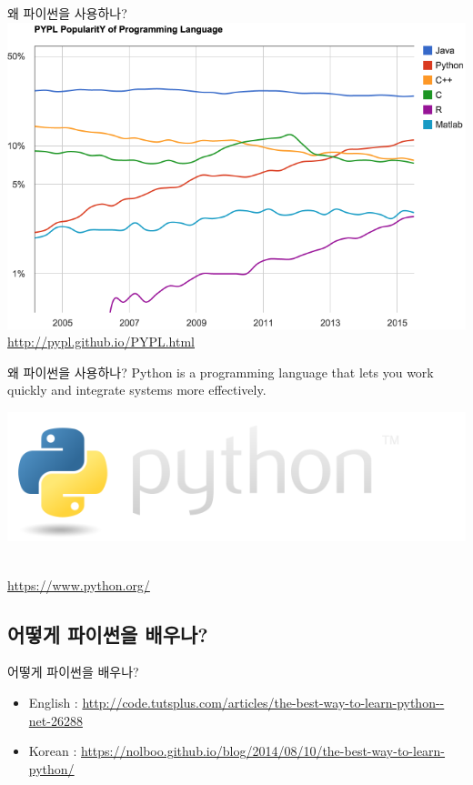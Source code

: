 \documentclass[10pt]{beamer}
\begin{document}
\begin{frame}{왜 파이썬을 사용하나?}{}
	\centering
	\includegraphics[scale=0.38]{contents/pypl.png}\\
	\tiny{\url{http://pypl.github.io/PYPL.html}}
\end{frame}

\begin{frame}{왜 파이썬을 사용하나?}{}
	Python is a programming language that lets you work quickly and integrate systems more effectively.
	{\centerline{
		\includegraphics[scale=0.5]{contents/python.png}
	}}
	\\
	\url{https://www.python.org/}
\end{frame}

\subsection{어떻게 파이썬을 배우나?}
\begin{frame}{어떻게 파이썬을 배우나?}{}
	\begin{itemize}
		\item English : \url{http://code.tutsplus.com/articles/the-best-way-to-learn-python--net-26288}
		\item Korean : \url{https://nolboo.github.io/blog/2014/08/10/the-best-way-to-learn-python/}
	\end{itemize}
\end{frame}
\end{document}
